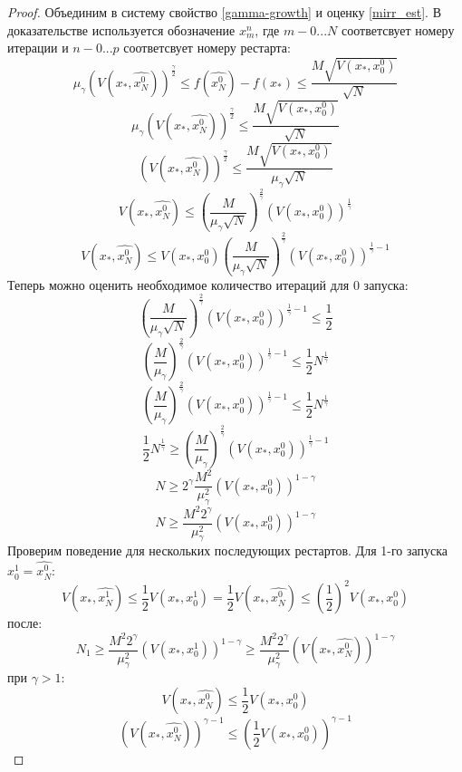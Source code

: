     \begin{proof}
       Объединим в систему свойство \ref{gamma-growth} и оценку \ref{mirr_est}. В доказательстве используется обозначение $x_m^n$, где $m - 0...N$ соответсвует номеру итерации и $n - 0...p$ соответсвует номеру рестарта: 
       $$
           \mu_{\gamma}(V(x_*, \widehat{x_N^0}))^{\frac{\gamma}{2}} \leq f(\widehat{x_N^0}) - f(x_*) \leq \frac{M\sqrt{V(x_*, x_0^0)}}{\sqrt{N}}
       $$
       $$
           \mu_{\gamma}(V(x_*, \widehat{x_N^0}))^{\frac{\gamma}{2}} \leq \frac{M\sqrt{V(x_*, x_0^0)}}{\sqrt{N}}
       $$
       $$
           (V(x_*, \widehat{x_N^0}))^{\frac{\gamma}{2}} \leq \frac{M\sqrt{V(x_*, x_0^0)}}{\mu_{\gamma}\sqrt{N}}
       $$
       $$
           V(x_*, \widehat{x_N^0}) \leq (\frac{M}{\mu_{\gamma}\sqrt{ N}})^{\frac{2}{\gamma}} (V(x_*, x_0^0))^{\frac{1}{\gamma}}
       $$
       $$
           V(x_*, \widehat{x_N^0}) \leq V(x_*, x_0^0) (\frac{M}{\mu_{\gamma}\sqrt{N}})^{\frac{2}{\gamma}} (V(x_*, x_0^0))^{\frac{1}{\gamma} - 1}
       $$
       Теперь можно оценить необходимое количество итераций для 0 запуска:
       $$
           (\frac{M}{\mu_{\gamma}\sqrt{N}})^{\frac{2}{\gamma}} (V(x_*, x_0^0))^{\frac{1}{\gamma} - 1} \leq \frac{1}{2} 
       $$
       $$
           (\frac{M}{\mu_{\gamma}})^{\frac{2}{\gamma}} (V(x_*, x_0^0))^{\frac{1}{\gamma} - 1} \leq \frac{1}{2} N^{\frac{1}{\gamma}} 
       $$
       $$
           (\frac{M}{\mu_{\gamma}})^{\frac{2}{\gamma}} (V(x_*, x_0^0))^{\frac{1}{\gamma} - 1} \leq \frac{1}{2} N^{\frac{1}{\gamma}} 
       $$
       $$
           \frac{1}{2} N^{\frac{1}{\gamma}} \geq (\frac{M}{\mu_{\gamma}})^{\frac{2}{\gamma}} (V(x_*, x_0^0))^{\frac{1}{\gamma} - 1}  
       $$
       $$
           N \geq 2 ^ {\gamma} \frac{M^2}{\mu_{\gamma}^2} (V(x_*, x_0^0))^{1 - \gamma}  
       $$
       $$
           N \geq \frac{M^2 2^{\gamma}}{\mu_{\gamma}^2} (V(x_*, x_0^0))^{1 - \gamma}  
       $$
       Проверим поведение для нескольких последующих рестартов. Для 1-го запуска $x_0^1 = \widehat{x_N^0}$:
       $$
           V(x_*, \widehat{x_N^1}) \leq \frac{1}{2} V(x_*, x_0^1) = \frac{1}{2} V(x_*, \widehat{x_N^0}) \leq (\frac{1}{2})^2 V(x_*, x_0^0) 
       $$
       после:
       $$
           N_1 \geq \frac{M^2 2^{\gamma}}{\mu_{\gamma}^2} (V(x_*, x_0^1))^{1 - \gamma} \geq \frac{M^2 2^{\gamma}}{\mu_{\gamma}^2} (V(x_*, \widehat{x_N^0}))^{1 - \gamma} 
       $$
       при $\gamma > 1$:
       $$
           V(x_*, \widehat{x_N^0}) \leq \frac{1}{2}V(x_*, x_0^0)  
       $$
       $$
           (V(x_*, \widehat{x_N^0}))^{\gamma - 1} \leq (\frac{1}{2} V(x_*, x_0^0))^{\gamma - 1}
$$
\end{proof}
